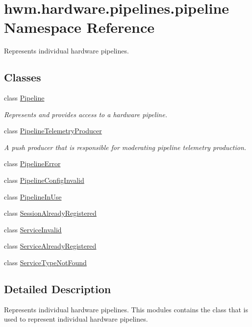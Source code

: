 \hypertarget{namespacehwm_1_1hardware_1_1pipelines_1_1pipeline}{\section{hwm.\-hardware.\-pipelines.\-pipeline Namespace Reference}
\label{namespacehwm_1_1hardware_1_1pipelines_1_1pipeline}
}


Represents individual hardware pipelines.  


\subsection*{Classes}
\begin{DoxyCompactItemize}
\item 
class \hyperlink{classhwm_1_1hardware_1_1pipelines_1_1pipeline_1_1_pipeline}{Pipeline}
\begin{DoxyCompactList}\small\item\em Represents and provides access to a hardware pipeline. \end{DoxyCompactList}\item 
class \hyperlink{classhwm_1_1hardware_1_1pipelines_1_1pipeline_1_1_pipeline_telemetry_producer}{Pipeline\-Telemetry\-Producer}
\begin{DoxyCompactList}\small\item\em A push producer that is responsible for moderating pipeline telemetry production. \end{DoxyCompactList}\item 
class \hyperlink{classhwm_1_1hardware_1_1pipelines_1_1pipeline_1_1_pipeline_error}{Pipeline\-Error}
\item 
class \hyperlink{classhwm_1_1hardware_1_1pipelines_1_1pipeline_1_1_pipeline_config_invalid}{Pipeline\-Config\-Invalid}
\item 
class \hyperlink{classhwm_1_1hardware_1_1pipelines_1_1pipeline_1_1_pipeline_in_use}{Pipeline\-In\-Use}
\item 
class \hyperlink{classhwm_1_1hardware_1_1pipelines_1_1pipeline_1_1_session_already_registered}{Session\-Already\-Registered}
\item 
class \hyperlink{classhwm_1_1hardware_1_1pipelines_1_1pipeline_1_1_service_invalid}{Service\-Invalid}
\item 
class \hyperlink{classhwm_1_1hardware_1_1pipelines_1_1pipeline_1_1_service_already_registered}{Service\-Already\-Registered}
\item 
class \hyperlink{classhwm_1_1hardware_1_1pipelines_1_1pipeline_1_1_service_type_not_found}{Service\-Type\-Not\-Found}
\end{DoxyCompactItemize}


\subsection{Detailed Description}
Represents individual hardware pipelines. This modules contains the class that is used to represent individual hardware pipelines. 